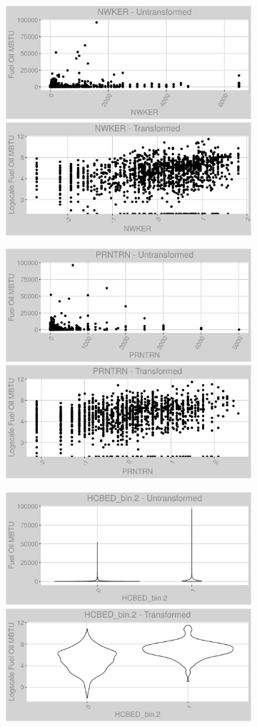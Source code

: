 \FloatBarrier
\newpage
\begin{figure}
\centering
\begin{subfigure}{1\textwidth}
\centering
\includegraphics[width=.49\textwidth, height=0.3\textheight]{Images/fuel_oil_var_original_3.png}
\includegraphics[width=.49\textwidth, height=0.3\textheight]{Images/fuel_oil_var_transformed_3.png}
\end{subfigure}
\begin{subfigure}{1\textwidth}
\centering
\includegraphics[width=.49\textwidth, height=0.3\textheight]{Images/fuel_oil_var_original_4.png}
\includegraphics[width=.49\textwidth, height=0.3\textheight]{Images/fuel_oil_var_transformed_4.png}
\end{subfigure}
\begin{subfigure}{1\textwidth}
\centering
\includegraphics[width=.49\textwidth, height=0.3\textheight]{Images/fuel_oil_var_original_5.png}
\includegraphics[width=.49\textwidth, height=0.3\textheight]{Images/fuel_oil_var_transformed_5.png}
\end{subfigure}
\end{figure}
